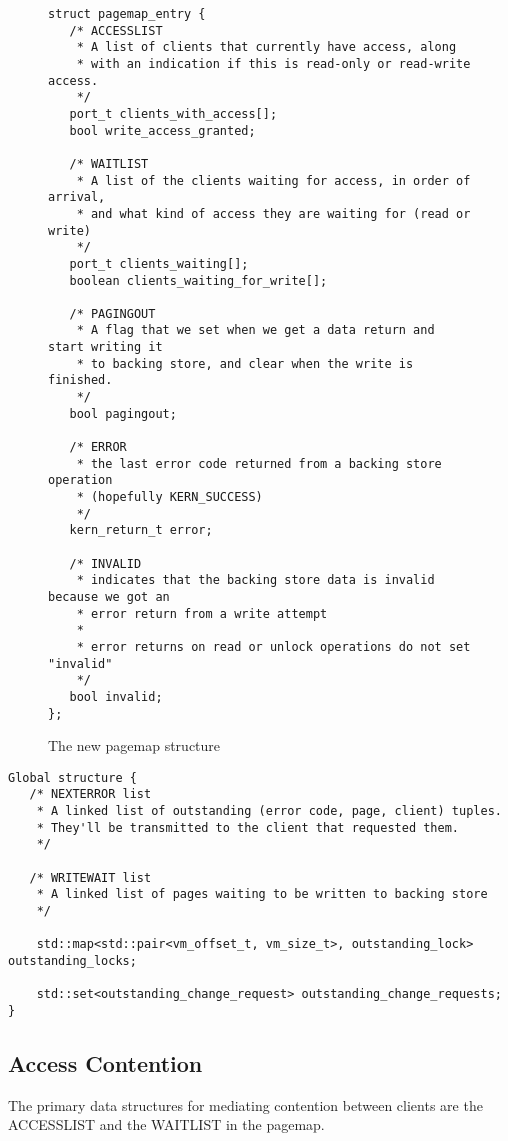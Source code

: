 \documentclass{article}
\begin{document}
\begin{figure}[h]
\begin{mdframed}[backgroundcolor=lightblue]
\begin{verbatim}
struct pagemap_entry {
   /* ACCESSLIST
    * A list of clients that currently have access, along
    * with an indication if this is read-only or read-write access.
    */
   port_t clients_with_access[];
   bool write_access_granted;

   /* WAITLIST
    * A list of the clients waiting for access, in order of arrival,
    * and what kind of access they are waiting for (read or write)
    */
   port_t clients_waiting[];
   boolean clients_waiting_for_write[];

   /* PAGINGOUT
    * A flag that we set when we get a data return and start writing it
    * to backing store, and clear when the write is finished.
    */
   bool pagingout;

   /* ERROR
    * the last error code returned from a backing store operation
    * (hopefully KERN_SUCCESS)
    */
   kern_return_t error;

   /* INVALID
    * indicates that the backing store data is invalid because we got an
    * error return from a write attempt
    *
    * error returns on read or unlock operations do not set "invalid"
    */
   bool invalid;
};
\end{verbatim}
\end{mdframed}
\caption{The new pagemap structure}
\end{figure}

\begin{verbatim}
Global structure {
   /* NEXTERROR list
    * A linked list of outstanding (error code, page, client) tuples.
    * They'll be transmitted to the client that requested them.
    */

   /* WRITEWAIT list
    * A linked list of pages waiting to be written to backing store
    */

    std::map<std::pair<vm_offset_t, vm_size_t>, outstanding_lock> outstanding_locks;

    std::set<outstanding_change_request> outstanding_change_requests;
}
\end{verbatim}

\subsection{Access Contention}

The primary data structures for mediating contention between clients
are the ACCESSLIST and the WAITLIST in the pagemap.
\end{document}

